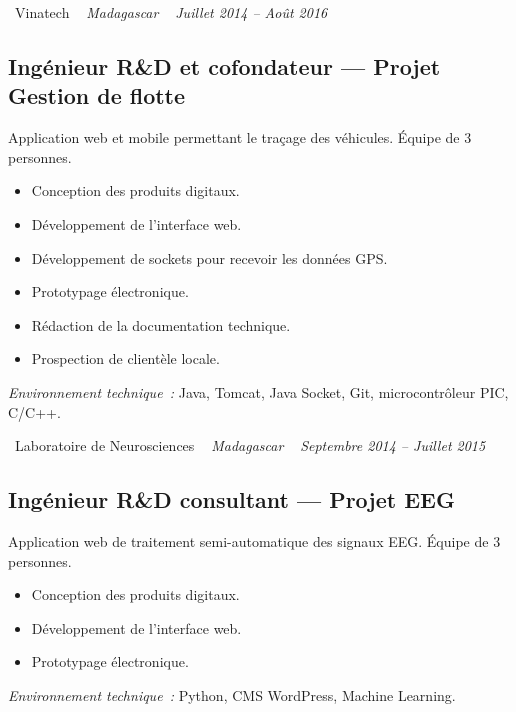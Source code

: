 \documentclass[10pt,a4paper]{article}
\begin{document}
\vspace{10pt}

\noindent\textcolor{primary}{ \faBuilding\ Vinatech} \quad
\textit{ \small \textcolor{darkgray}{ \faMapMarker\ } Madagascar } \hfill
\textit{ \small \textcolor{darkgray}{ \faCalendar\ } Juillet 2014 -- Août 2016 }

\vspace{4pt}

\subsection*{Ingénieur R\&D et cofondateur --- Projet Gestion de flotte}
\color{darkgray}
Application web et mobile permettant le traçage des véhicules. Équipe de 3 personnes.
\begin{itemize}
  \item Conception des produits digitaux.
  \item Développement de l'interface web.
  \item Développement de sockets pour recevoir les données GPS.
  \item Prototypage électronique.
  \item Rédaction de la documentation technique.
  \item Prospection de clientèle locale.
\end{itemize}
\textit{Environnement technique~:} Java, Tomcat, Java Socket, Git, microcontrôleur PIC, C/C++.

\vspace{10pt}

\noindent\textcolor{primary}{ \faBuilding\ Laboratoire de Neurosciences} \quad
\textit{ \small \textcolor{darkgray}{ \faMapMarker\ } Madagascar } \hfill
\textit{ \small \textcolor{darkgray}{ \faCalendar\ } Septembre 2014 -- Juillet 2015 }

\vspace{4pt}

\subsection*{Ingénieur R\&D consultant --- Projet EEG}
\color{darkgray}
Application web de traitement semi-automatique des signaux EEG. Équipe de 3 personnes.
\begin{itemize}
  \item Conception des produits digitaux.
  \item Développement de l'interface web.
  \item Prototypage électronique.
\end{itemize}
\textit{Environnement technique~:} Python, CMS WordPress, Machine Learning.
\end{document}
